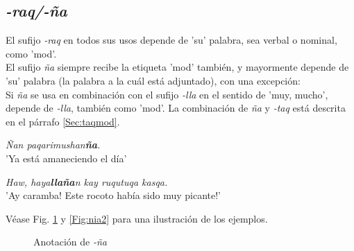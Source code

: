 \documentclass[a4paper,11pt,DIV12]{scrartcl}
\begin{document}
  \subsection{{\em-raq/-\~na}}
El sufijo {\em -raq} en todos sus usos depende de 'su' palabra, sea verbal o nominal, como 'mod'.\\
El sufijo {\em \~na} siempre recibe la etiqueta 'mod' tambi\'en, y mayormente depende de 'su' palabra (la palabra a la cu\'al est\'a adjuntado), con una excepci\'on:\\
Si {\em \~na} se usa en combinaci\'on con el sufijo {\em -lla} en el sentido de 'muy, mucho', depende de {\em -lla}, tambi\'en como 'mod'. La combinaci\'on de {\em \~na} y {\em -taq} est\'a descrita en el p\'arrafo \ref{Sec:taqmod}.

\begin{examples}
 \item {\em \~Nan paqarimushan\textbf{\~na}.}\\
	'Ya est\'a amaneciendo el d\'ia'
 \item {\em Haw, haya\textbf{lla\~na}n kay ruqutuqa kasqa.}\\
	'{\textexclamdown}Ay caramba! {\textexclamdown}Este rocoto hab\'ia sido muy picante!'
    		\hfill{\small \citep[246]{Cusi2}}
\end{examples}

V\'ease Fig. \ref{Fig:nia1} y \ref{Fig:nia2} para una ilustraci\'on de los ejemplos.

\begin{figure}
\begin{center}
 \caption{Anotaci\'on de {\em  -\~na}}\label{Fig:nia1}
\end{center}
\end{figure}
\end{document}
